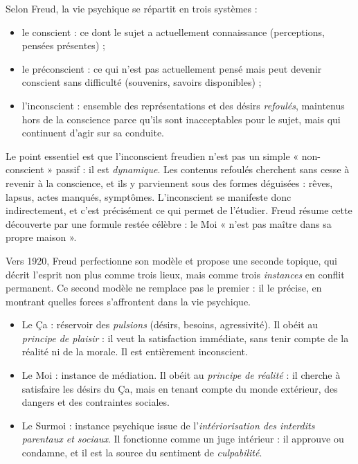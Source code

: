 \documentclass[11pt]{article}
\newcommand{\cle}[1]{{\popxbold\color{popdark}#1}}
\newcounter{popsec}
\newcounter{popsub}
\newcommand{\courssub}[1]{%
  \stepcounter{popsub}%
  \par\vspace{9pt}\noindent{\popxbold\fontsize{11.5}{13}\selectfont\color{popink}{\color{poporange}\thepopsec.\thepopsub}\hspace{6pt}#1}\par\nopagebreak\vspace{4pt}
}
\begin{document}
\begin{definition}
Selon Freud, la vie psychique se répartit en trois systèmes :
\begin{itemize}
\item le \cle{conscient} : ce dont le sujet a actuellement connaissance (perceptions, pensées présentes) ;
\item le \cle{préconscient} : ce qui n'est pas actuellement pensé mais peut devenir conscient sans difficulté (souvenirs, savoirs disponibles) ;
\item l'\cle{inconscient} : ensemble des représentations et des désirs \emph{refoulés}, maintenus hors de la conscience parce qu'ils sont inacceptables pour le sujet, mais qui continuent d'agir sur sa conduite.
\end{itemize}
\end{definition}

Le point essentiel est que l'inconscient freudien n'est pas un simple « non-conscient » passif : il est \emph{dynamique}. Les contenus refoulés cherchent sans cesse à revenir à la conscience, et ils y parviennent sous des formes déguisées : rêves, lapsus, actes manqués, symptômes. L'inconscient se manifeste donc indirectement, et c'est précisément ce qui permet de l'étudier. Freud résume cette découverte par une formule restée célèbre : le Moi « n'est pas maître dans sa propre maison ».

\courssub{La seconde topique : le Ça, le Moi, le Surmoi}

Vers 1920, Freud perfectionne son modèle et propose une \cle{seconde topique}, qui décrit l'esprit non plus comme trois lieux, mais comme trois \emph{instances} en conflit permanent. Ce second modèle ne remplace pas le premier : il le précise, en montrant quelles forces s'affrontent dans la vie psychique.

\begin{definition}
\begin{itemize}
\item Le \cle{Ça} : réservoir des \emph{pulsions} (désirs, besoins, agressivité). Il obéit au \emph{principe de plaisir} : il veut la satisfaction immédiate, sans tenir compte de la réalité ni de la morale. Il est entièrement inconscient.
\item Le \cle{Moi} : instance de médiation. Il obéit au \emph{principe de réalité} : il cherche à satisfaire les désirs du Ça, mais en tenant compte du monde extérieur, des dangers et des contraintes sociales.
\item Le \cle{Surmoi} : instance psychique issue de l'\emph{intériorisation des interdits parentaux et sociaux}. Il fonctionne comme un juge intérieur : il approuve ou condamne, et il est la source du sentiment de \emph{culpabilité}.
\end{itemize}
\end{definition}
\end{document}
